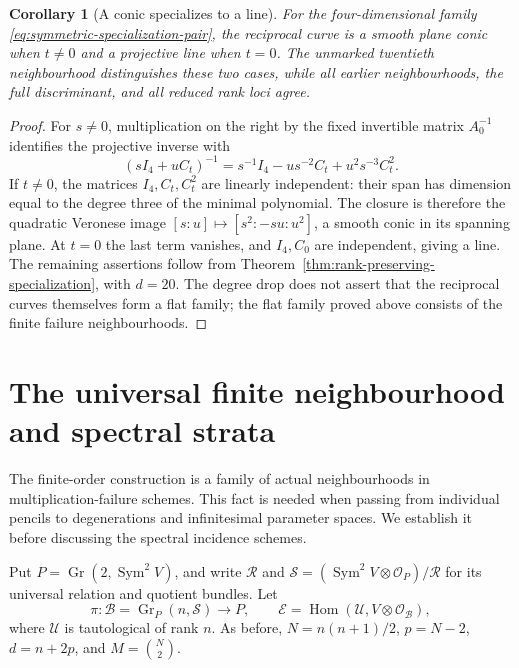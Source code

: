 \documentclass[11pt,reqno]{amsart}
\numberwithin{equation}{section}
\newtheorem{corollary}[theorem]{Corollary}
\theoremstyle{definition}\newtheorem{definition}[theorem]{Definition}
\theoremstyle{remark}\newtheorem{remark}[theorem]{Remark}
\newcommand{\OO}{\mathcal O}\newcommand{\II}{\mathcal I}
\DeclareMathOperator{\Sym}{Sym}\DeclareMathOperator{\Gr}{Gr}
\DeclareMathOperator{\Hom}{Hom}\DeclareMathOperator{\Tot}{Tot}
\begin{document}
\begin{corollary}[A conic specializes to a line]
\label{cor:reciprocal-conic-line}
For the four-dimensional family \eqref{eq:symmetric-specialization-pair},
the reciprocal curve is a smooth plane conic when \(t\ne0\)
and a projective line when \(t=0\).  The unmarked twentieth
neighbourhood distinguishes these two cases, while all earlier
neighbourhoods, the full discriminant, and all reduced rank loci agree.
\end{corollary}
\begin{proof}
For \(s\ne0\), multiplication on the right by the fixed
invertible matrix \(A_0^{-1}\) identifies the projective inverse
with
\[
 (sI_4+uC_t)^{-1}
   =s^{-1}I_4-us^{-2}C_t+u^2s^{-3}C_t^2.
\]
If \(t\ne0\), the matrices \(I_4,C_t,C_t^2\) are
linearly independent: their span has dimension equal to the degree
three of the minimal polynomial.  The closure is therefore the
quadratic Veronese image \([s:u]\mapsto[s^2:-su:u^2]\),
a smooth conic in its spanning plane.  At \(t=0\) the last term
vanishes, and \(I_4,C_0\) are independent, giving a line.
The remaining assertions follow from
Theorem~\ref{thm:rank-preserving-specialization}, with \(d=20\).
The degree drop does not assert that the reciprocal curves themselves
form a flat family; the flat family proved above consists of the
finite failure neighbourhoods.
\end{proof}

\section{The universal finite neighbourhood and spectral strata}
\label{sec:relative-spectral-strata}

The finite-order construction is a family of actual neighbourhoods in
multiplication-failure schemes.  This fact is needed when passing from
individual pencils to degenerations and infinitesimal parameter spaces.
We establish it before discussing the spectral incidence schemes.

Put \(P=\Gr(2,\Sym^2V)\), and write \(\mathcal R\) and
\(\mathcal S=(\Sym^2V\otimes\OO_P)/\mathcal R\) for its
universal relation and quotient bundles.  Let
\[
 \pi:\mathcal B=\Gr_P(n,\mathcal S)\longrightarrow P,
 \qquad \mathcal E=\Hom(\mathcal U,V\otimes\OO_{\mathcal B}),
\]
where \(\mathcal U\) is tautological of rank \(n\).  As before,
\(N=n(n+1)/2\), \(p=N-2\), \(d=n+2p\), and
\(M=\binom N2\).
\end{document}
